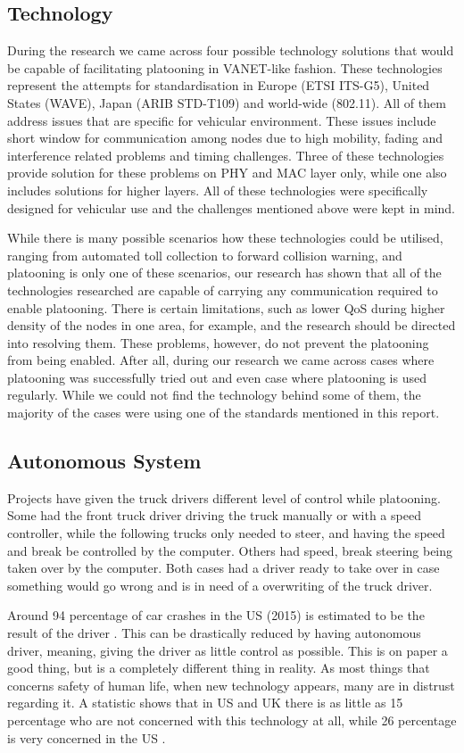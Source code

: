 \subsection{Technology}
% 
During the research we came across four possible technology solutions that would be capable of facilitating platooning in VANET-like fashion. These technologies represent the attempts for standardisation in Europe (ETSI ITS-G5), United States (WAVE), Japan (ARIB STD-T109) and world-wide (802.11). All of them address issues that are specific for vehicular environment. These issues include short window for communication among nodes due to high mobility, fading and interference related problems and timing challenges. Three of these technologies provide solution for these problems on PHY and MAC layer only, while one also includes solutions for higher layers. All of these technologies were specifically designed for vehicular use and the challenges mentioned above were kept in mind.\par
% 
While there is many possible scenarios how these technologies could be utilised, ranging from automated toll collection to forward collision warning, and platooning is only one of these scenarios, our research has shown that all of the technologies researched are capable of carrying any communication required to enable platooning. There is certain limitations, such as lower QoS during higher density of the nodes in one area, for example, and the research should be directed into resolving them. These problems, however, do not prevent the platooning from being enabled. After all, during our research we came across cases where platooning was successfully tried out and even case where platooning is used regularly. While we could not find the technology behind some of them, the majority of the cases were using one of the standards mentioned in this report.\par
% 
%
\subsection{Autonomous System}
Projects have given the truck drivers different level of control while platooning. Some had the front truck driver driving the truck manually or with a speed controller, while the following trucks only needed to steer, and having the speed and break be controlled by the computer. Others had speed, break steering being taken over by the computer. Both cases had a driver ready to take over in case something would go wrong and is in need of a overwriting of the truck driver.\par
% 
Around 94 percentage of car crashes in the US (2015) is estimated to be the result of the driver \cite{HighwayTrafficSafetyAdministration2015TRAFFICSurvey}.
This can be drastically reduced by having autonomous driver, meaning, giving the driver as little control as possible. This is on paper a good thing, but is a completely different thing in reality. As most things that concerns safety of human life, when new technology appears, many are in distrust regarding it. A statistic shows that in US and UK there is as little as 15 percentage who are not concerned with this technology at all, while 26 percentage is very concerned in the US \cite{Schoettle2014AAustralia}. 

